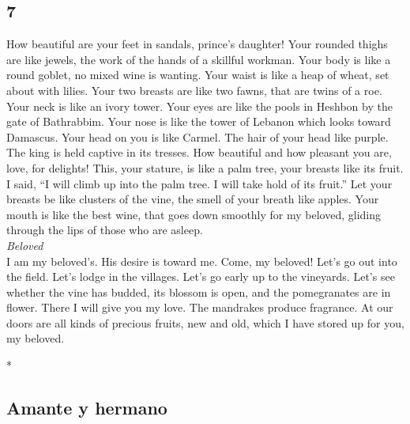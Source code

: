 \begin{paracol}{2}
\switchcolumn
\begin{otherlanguage}{english}

\hypertarget{section-13}{%
\section{7}\label{section-13}}

 How beautiful are your feet in sandals, prince's
daughter! Your rounded thighs are like jewels, the work of the hands of
a skillful workman.  Your body is like a round goblet, no
mixed wine is wanting. Your waist is like a heap of wheat, set about
with lilies.  Your two breasts are like two fawns, that
are twins of a roe.  Your neck is like an ivory tower.
Your eyes are like the pools in Heshbon by the gate of Bathrabbim. Your
nose is like the tower of Lebanon which looks toward Damascus.
 Your head on you is like Carmel. The hair of your head
like purple. The king is held captive in its tresses.  How
beautiful and how pleasant you are, love, for delights! 
This, your stature, is like a palm tree, your breasts like its fruit.
 I said, ``I will climb up into the palm tree. I will take
hold of its fruit.'' Let your breasts be like clusters of the vine, the
smell of your breath like apples.  Your mouth is like the
best wine, that goes down smoothly for my beloved, gliding through the
lips of those who are asleep.\\
\emph{Beloved }\\
 I am my beloved's. His desire is toward me.
 Come, my beloved! Let's go out into the field. Let's
lodge in the villages.  Let's go early up to the
vineyards. Let's see whether the vine has budded, its blossom is open,
and the pomegranates are in flower. There I will give you my love.
 The mandrakes produce fragrance. At our doors are all
kinds of precious fruits, new and old, which I have stored up for you,
my beloved.

\end{otherlanguage}

\switchcolumn[0]*

\hypertarget{amante-y-hermano}{%
\subsection{Amante y hermano}\label{amante-y-hermano}}


\end{paracol}
